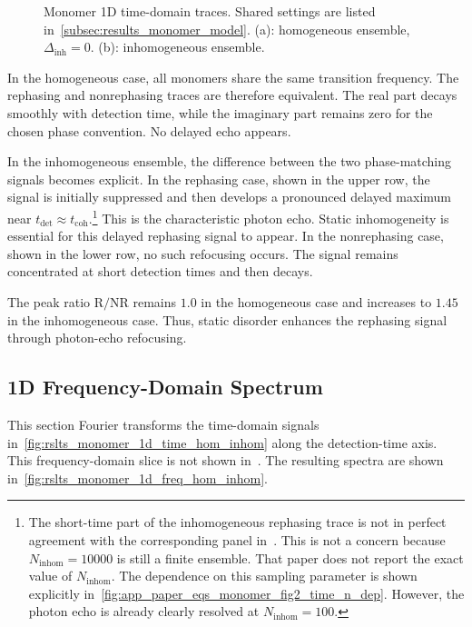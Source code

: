 \begin{figure}[htbp]
    \centering
\caption{Monomer 1D time-domain traces. Shared settings are listed
in~\autoref{subsec:results_monomer_model}. (a): homogeneous ensemble,
\(\Delta_{\mathrm{inh}}=0\). (b): inhomogeneous
ensemble.}
    \label{fig:rslts_monomer_1d_time_hom_inhom}
\end{figure}

In the homogeneous case, all monomers share the same transition frequency. The rephasing and nonrephasing traces are therefore equivalent. The real part decays smoothly with detection time, while the imaginary part remains zero for the chosen phase convention. No delayed echo appears.

In the inhomogeneous ensemble, the difference between the two phase-matching signals becomes explicit. In the rephasing case, shown in the upper row, the signal is initially suppressed and then develops a pronounced delayed maximum near $t_{\mathrm{det}}\approx t_{\mathrm{coh}}$.\footnote{The short-time part of the inhomogeneous rephasing trace is not in perfect agreement with the corresponding panel in~\cite{mancaletal2006twodimensionalopticalthreepulse}. This is not a concern because $N_{\mathrm{inhom}}=10000$ is still a finite ensemble. That paper does not report the exact value of $N_{\mathrm{inhom}}$. The dependence on this sampling parameter is shown explicitly in~\autoref{fig:app_paper_eqs_monomer_fig2_time_n_dep}. However, the photon echo is already clearly resolved at $N_{\mathrm{inhom}}=100$.} This is the characteristic photon echo. Static inhomogeneity is essential for this delayed rephasing signal to appear. In the nonrephasing case, shown in the lower row, no such refocusing occurs. The signal remains concentrated at short detection times and then decays.

The peak ratio \(\mathrm{R}/\mathrm{NR}\) remains \(1.0\) in the homogeneous
case and increases to \(1.45\) in the inhomogeneous case. Thus, static disorder
enhances the rephasing signal through photon-echo refocusing.


\subsection{1D Frequency-Domain Spectrum}
\label{subsec:results_monomer_1d_freq}
This section Fourier transforms the time-domain signals in~\autoref{fig:rslts_monomer_1d_time_hom_inhom} along the detection-time axis. This frequency-domain slice is not shown in~\cite{mancaletal2006twodimensionalopticalthreepulse}. The resulting spectra are shown in~\autoref{fig:rslts_monomer_1d_freq_hom_inhom}.

